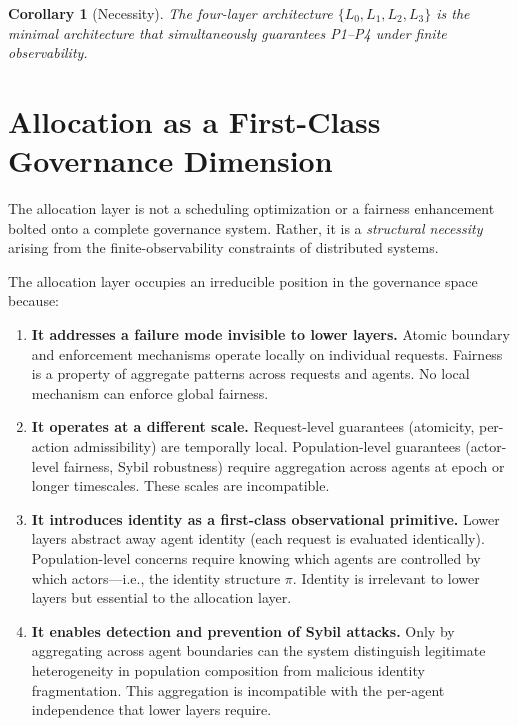 \documentclass[11pt]{article}
\newtheorem{corollary}[theorem]{Corollary}
\newcommand{\Layer}[1]{L_{#1}}
\begin{document}
\begin{corollary}[Necessity]
\label{cor:necessity}
The four-layer architecture $\{\Layer{0},\Layer{1},\Layer{2},\Layer{3}\}$ is the minimal architecture that simultaneously guarantees P1--P4 under finite observability.
\end{corollary}

\section{Allocation as a First-Class Governance Dimension}
\label{sec:allocation-dimension}

The allocation layer is not a scheduling optimization or a fairness enhancement bolted onto a complete governance system. Rather, it is a \emph{structural necessity} arising from the finite-observability constraints of distributed systems.

The allocation layer occupies an irreducible position in the governance space because:

\begin{enumerate}[label=(\roman*),noitemsep]
  \item \textbf{It addresses a failure mode invisible to lower layers.} Atomic boundary and enforcement mechanisms operate locally on individual requests. Fairness is a property of aggregate patterns across requests and agents. No local mechanism can enforce global fairness.

  \item \textbf{It operates at a different scale.} Request-level guarantees (atomicity, per-action admissibility) are temporally local. Population-level guarantees (actor-level fairness, Sybil robustness) require aggregation across agents at epoch or longer timescales. These scales are incompatible.

  \item \textbf{It introduces identity as a first-class observational primitive.} Lower layers abstract away agent identity (each request is evaluated identically). Population-level concerns require knowing which agents are controlled by which actors---i.e., the identity structure $\pi$. Identity is irrelevant to lower layers but essential to the allocation layer.

  \item \textbf{It enables detection and prevention of Sybil attacks.} Only by aggregating across agent boundaries can the system distinguish legitimate heterogeneity in population composition from malicious identity fragmentation. This aggregation is incompatible with the per-agent independence that lower layers require.
\end{enumerate}
\end{document}
